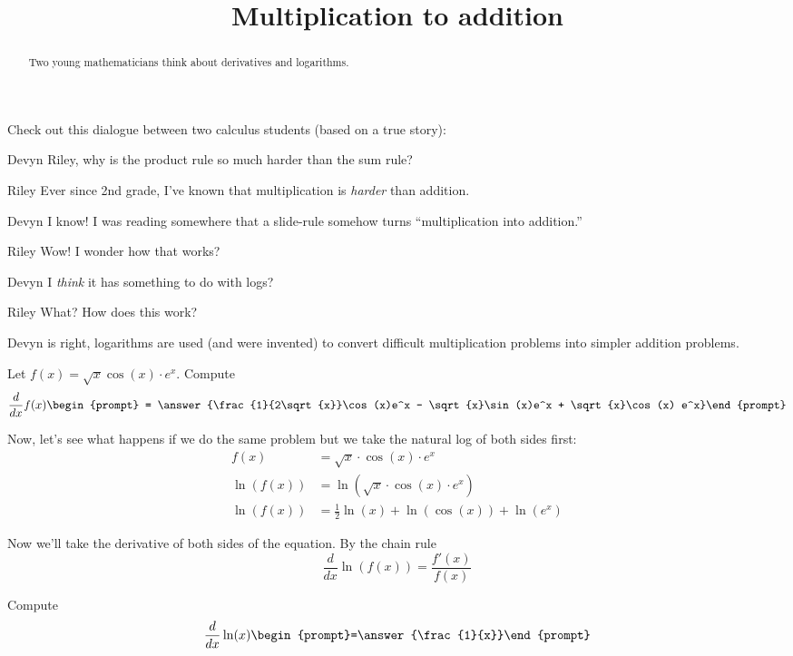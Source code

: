 \documentclass{ximera}
\title[Break-Ground:]{Multiplication to addition}
\begin{document}
\begin{abstract}
Two young mathematicians think about derivatives and logarithms.
\end{abstract}
\maketitle


Check out this dialogue between two calculus students (based on a true
story):

\begin{dialogue}
\item[Devyn] Riley, why is the product rule so much harder than the sum rule?
\item[Riley] Ever since 2nd grade, I've known that multiplication is
  \textit{harder} than addition.
\item[Devyn] I know! I was reading somewhere that a slide-rule somehow
  turns ``multiplication into addition.''
\item[Riley] Wow! I wonder how that works?
\item[Devyn] I \textit{think} it has something to do with logs?
\item[Riley] What? How does this work?
\end{dialogue}

Devyn is right, logarithms are used (and were invented) to convert
difficult multiplication problems into simpler addition problems.

\begin{problem}
  Let $f(x) =  \sqrt{x} \cos(x) \cdot e^x$. Compute
  \[
  \frac{d}{dx} f(x)\begin{prompt} = \answer{\frac{1}{2\sqrt{x}}\cos(x)e^x -  \sqrt{x}\sin(x)e^x +  \sqrt{x}\cos(x) e^x}\end{prompt}
  \]
\end{problem}

Now, let's see what happens if we do the same problem but we take the
natural log of both sides first:
\begin{align*}
  f(x) &= \sqrt{x}\cdot\cos(x)\cdot e^x\\
  \ln(f(x)) &= \ln( \sqrt{x}\cdot\cos(x)\cdot e^x)\\
  \ln(f(x)) &=\frac{1}{2}\ln{(x)} + \ln(\cos(x)) + \ln(e^x)
\end{align*}

Now we'll take the derivative of both sides of the equation.
By the chain rule
\[
\frac{d}{dx} \ln(f(x))= \frac{f'(x)}{f(x)}
\]


\begin{problem}
  Compute %
  \[
  \frac{d}{dx} \ln(x)  \begin{prompt}=\answer{\frac{1}{x}}\end{prompt}
  \]
\end{problem}
\end{document}
